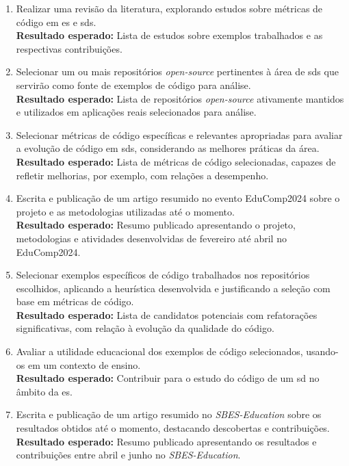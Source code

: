\begin{enumerate}
    \item Realizar uma revisão da literatura, explorando estudos sobre métricas de código em \gls{es} e \gls{sds}.
    \\\textbf{Resultado esperado:} Lista de estudos sobre exemplos trabalhados e as respectivas contribuições.

    \item Selecionar um ou mais repositórios \textit{open-source} pertinentes à área de \gls{sds} que servirão como fonte de exemplos de código para análise.
    \\\textbf{Resultado esperado:} Lista de repositórios \textit{open-source} ativamente mantidos e utilizados em aplicações reais selecionados para análise.

    \item Selecionar métricas de código específicas e relevantes apropriadas para avaliar a evolução de código em \gls{sds}, considerando as melhores práticas da área.
    \\\textbf{Resultado esperado:} Lista de métricas de código selecionadas, capazes de refletir melhorias, por exemplo, com relações a desempenho.

    \item Escrita e publicação de um artigo resumido no evento EduComp2024 sobre o projeto e as metodologias utilizadas até o momento.
    \\\textbf{Resultado esperado:} Resumo publicado apresentando o projeto, metodologias e atividades desenvolvidas de fevereiro até abril no EduComp2024.

    \item Selecionar exemplos específicos de código trabalhados nos repositórios escolhidos, aplicando a heurística desenvolvida e justificando a seleção com base em métricas de código.
    \\\textbf{Resultado esperado:} Lista de candidatos potenciais com refatorações significativas, com relação à evolução da qualidade do código.

    \item Avaliar a utilidade educacional dos exemplos de código selecionados, usando-os em um contexto de ensino.
    \\\textbf{Resultado esperado:} Contribuir para o estudo do código de um \gls{sd} no âmbito da \gls{es}.

    \item Escrita e publicação de um artigo resumido no \textit{SBES-Education} sobre os resultados obtidos até o momento, destacando descobertas e contribuições.
    \\\textbf{Resultado esperado:} Resumo publicado apresentando os resultados e contribuições entre abril e junho no \textit{SBES-Education}.
\end{enumerate}


